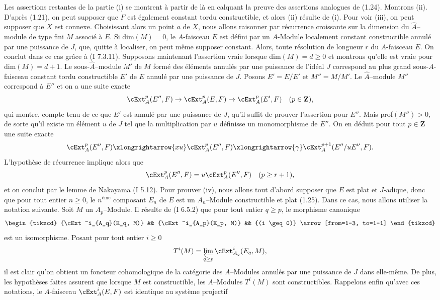 Les assertions restantes de la partie (i) se montrent à partir de là en calquant la preuve des assertions analogues de (1.24). Montrons (ii). D'après (1.21), on peut supposer que $F$ est également constant tordu constructible, et alors (ii) résulte de (i). Pour voir (iii), on peut supposer que $X$ est connexe. Choisissant alors un point $a$ de $X$, nous allons raisonner par récurrence croissante sur la dimension du $\hat{A}$--module de type fini $M$ associé à $E$. Si dim$(M) = 0$, le $A$-faisceau $E$ est défini par un $A$-Module localement constant constructible annulé par une puissance de $J$, que, quitte à localiser, on peut même supposer constant. Alors, toute résolution de longueur $r$ du $A$-faisceau $E$. On conclut dans ce cas grâce à (I 7.3.11). Supposons maintenant l'assertion vraie lorsque dim$(M) = d \geq 0$ et montrons qu'elle est vraie pour dim$(M) = d+1$. Le sous-$\hat{A}$--module $M'$ de $M$ formé des éléments annulés par une puissance de l'idéal $J$ correspond au plus grand sous-$A$-faisceau constant tordu constructible $E'$ de $E$ annulé par une puissance de $J$. Posons $E' = E/E'$ et $M'' = M/M'$. Le $\hat{A}$--module $M''$ correspond à $E''$ et on a une suite exacte
$$
\cExt^p_A(E'', F) \to \cExt^p_A(E, F) \to \cExt^p_A(E', F) \quad (p \in \mathbf{Z}),
$$
qui montre, compte tenu de ce que $E'$ est annulé par une puissance de $J$, qu'il suffit de prouver l'assertion pour $E''$. Mais prof$(M'') > 0$, de sorte qu'il existe un élément $u$ de $J$ tel que la multiplication par $u$ définisse un monomorphisme de $E''$. On en déduit pour tout $p \in \mathbf{Z}$ une suite exacte
$$
\cExt^p_A(E'', F) \xlongrightarrow{xu} \cExt^p_A(E'', F) \xlongrightarrow{\gamma} \cExt^{p+1}_A(E''/uE'', F).
$$
L'hypothèse de récurrence implique alors que 
$$
\cExt^p_A(E'', F) = u \cExt^p_A(E'', F) \quad (p \geq r+1),
$$
et on conclut par le lemme de Nakayama (I 5.12). Pour prouver (iv), nous allons tout d'abord supposer que $E$ est plat et $J$-adique, donc que pour tout entier $n \geq 0$, le $n^{\text{ème}}$ composant $E_n$ de $E$ est un $A_n$--Module constructible et plat (1.25). Dans ce cas, nous allons utiliser la notation suivante. Soit $M$ un $A_p$--Module. Il résulte de (I 6.5.2) que pour tout entier $q \geq p$, le morphisme canonique
\[\begin{tikzcd}
	{\cExt^i_{A_q}(E_q, M)} && {\cExt^i_{A_p}(E_p, M)} && {(i \geq 0)}
	\arrow[from=1-3, to=1-1]
\end{tikzcd}\]
est un isomorphisme. Posant pour tout entier $i \geq 0$
$$
T^i(M) = \varprojlim_{q \geq p}\cExt^i_{A_q}(E_q, M),
$$
il est clair qu'on obtient un foncteur cohomologique de la catégorie des $A$--Modules annulés par une puissance de $J$ dans elle-même. De plus, les hypothèses faites assurent que lorsque $M$ est constructible, les $A$--Modules $T^i(M)$ sont constructibles. Rappelons enfin qu'avec ces notations, le $A$-faisceau $\cExt^i_A(E, F)$ est identique au système projectif
